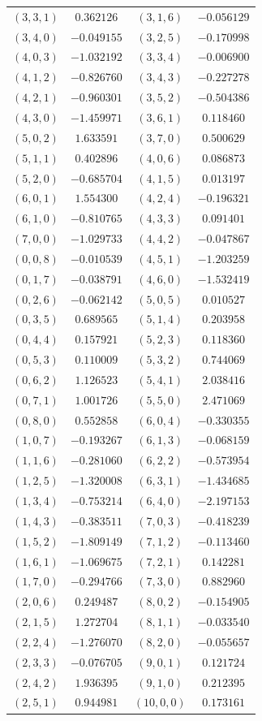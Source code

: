 \begin{table}
\begin{tabular}{cc@{\qquad}cc}
$(3,3,1)$ & $0.362126$ & $(3,1,6)$ & $-0.056129$ \\
$(3,4,0)$ & $-0.049155$ & $(3,2,5)$ & $-0.170998$ \\
$(4,0,3)$ & $-1.032192$ & $(3,3,4)$ & $-0.006900$ \\
$(4,1,2)$ & $-0.826760$ & $(3,4,3)$ & $-0.227278$ \\
$(4,2,1)$ & $-0.960301$ & $(3,5,2)$ & $-0.504386$ \\
$(4,3,0)$ & $-1.459971$ & $(3,6,1)$ & $0.118460$ \\
$(5,0,2)$ & $1.633591$ & $(3,7,0)$ & $0.500629$ \\
$(5,1,1)$ & $0.402896$ & $(4,0,6)$ & $0.086873$ \\
$(5,2,0)$ & $-0.685704$ & $(4,1,5)$ & $0.013197$ \\
$(6,0,1)$ & $1.554300$ & $(4,2,4)$ & $-0.196321$ \\
$(6,1,0)$ & $-0.810765$ & $(4,3,3)$ & $0.091401$ \\
$(7,0,0)$ & $-1.029733$ & $(4,4,2)$ & $-0.047867$ \\
$(0,0,8)$ & $-0.010539$ & $(4,5,1)$ & $-1.203259$ \\
$(0,1,7)$ & $-0.038791$ & $(4,6,0)$ & $-1.532419$ \\
$(0,2,6)$ & $-0.062142$ & $(5,0,5)$ & $0.010527$ \\
$(0,3,5)$ & $0.689565$ & $(5,1,4)$ & $0.203958$ \\
$(0,4,4)$ & $0.157921$ & $(5,2,3)$ & $0.118360$ \\
$(0,5,3)$ & $0.110009$ & $(5,3,2)$ & $0.744069$ \\
$(0,6,2)$ & $1.126523$ & $(5,4,1)$ & $2.038416$ \\
$(0,7,1)$ & $1.001726$ & $(5,5,0)$ & $2.471069$ \\
$(0,8,0)$ & $0.552858$ & $(6,0,4)$ & $-0.330355$ \\
$(1,0,7)$ & $-0.193267$ & $(6,1,3)$ & $-0.068159$ \\
$(1,1,6)$ & $-0.281060$ & $(6,2,2)$ & $-0.573954$ \\
$(1,2,5)$ & $-1.320008$ & $(6,3,1)$ & $-1.434685$ \\
$(1,3,4)$ & $-0.753214$ & $(6,4,0)$ & $-2.197153$ \\
$(1,4,3)$ & $-0.383511$ & $(7,0,3)$ & $-0.418239$ \\
$(1,5,2)$ & $-1.809149$ & $(7,1,2)$ & $-0.113460$ \\
$(1,6,1)$ & $-1.069675$ & $(7,2,1)$ & $0.142281$ \\
$(1,7,0)$ & $-0.294766$ & $(7,3,0)$ & $0.882960$ \\
$(2,0,6)$ & $0.249487$ & $(8,0,2)$ & $-0.154905$ \\
$(2,1,5)$ & $1.272704$ & $(8,1,1)$ & $-0.033540$ \\
$(2,2,4)$ & $-1.276070$ & $(8,2,0)$ & $-0.055657$ \\
$(2,3,3)$ & $-0.076705$ & $(9,0,1)$ & $0.121724$ \\
$(2,4,2)$ & $1.936395$ & $(9,1,0)$ & $0.212395$ \\
$(2,5,1)$ & $0.944981$ & $(10,0,0)$ & $0.173161$ \\
\hline
\end{tabular}
\end{table}
